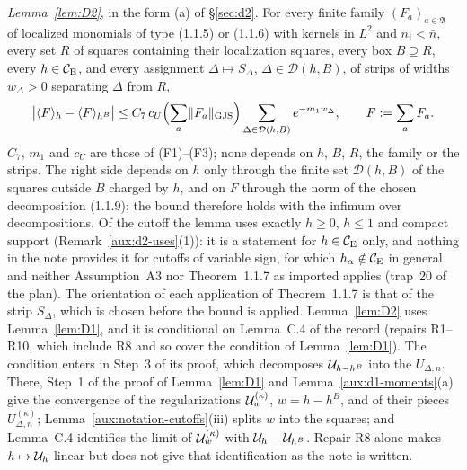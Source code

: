 \emph{Lemma~\ref{lem:D2}}, in the form (a) of \S\ref{sec:d2}. For every finite family
$(F_a)_{a\in\mathfrak A}$ of localized monomials of type (1.1.5) or (1.1.6) with kernels in
$L^2$ and $n_i<\bar n$, every set $R$ of squares containing their localization squares, every
box $B\supseteq R$, every $h\in\mathcal{C}_{\mathrm E}$, and every assignment $\Delta\mapsto S_\Delta$,
$\Delta\in\mathcal D(h,B)$, of strips of widths $w_\Delta>0$ separating $\Delta$ from $R$,
\[
 \bigl|\langle F\rangle_{h}-\langle F\rangle_{h^B}\bigr|\le C_7\,c_U\Bigl(\sum_a\lVert F_a\rVert_{\mathrm{GJS}}\Bigr)
 \sum_{\Delta\in\mathcal D(h,B)}e^{-m_1w_\Delta},\qquad F:=\sum_aF_a .
\]
$C_7$, $m_1$ and $c_U$ are those of (F1)--(F3); none depends on $h$, $B$, $R$, the family or the
strips. The right side depends on $h$ only through the finite set $\mathcal D(h,B)$ of the
squares outside $B$ charged by $h$, and on $F$ through the norm of the chosen decomposition
(1.1.9); the bound therefore holds with the infimum over decompositions. Of the cutoff the
lemma uses exactly $h\ge0$, $h\le1$ and compact support (Remark~\ref{aux:d2-uses}(1)): it is a
statement for $h\in\mathcal{C}_{\mathrm E}$ only, and nothing in the note provides it for cutoffs of variable sign,
for which $h_\alpha\notin\mathcal{C}_{\mathrm E}$ in general and neither Assumption~A3 nor Theorem~1.1.7 as
imported applies (trap~20 of the plan). The orientation of each application of
Theorem~1.1.7 is that of the strip $S_\Delta$, which is chosen before the bound is applied.
Lemma~\ref{lem:D2} uses Lemma~\ref{lem:D1}, and it is conditional on Lemma~C.4 of the record
(repairs R1--R10, which include R8 and so cover the condition of Lemma~\ref{lem:D1}).  The
condition enters in Step~3 of its proof, which decomposes $\mathcal U_{h-h^B}$ into the
$U_{\Delta,n}$.  There, Step~1 of the proof of Lemma~\ref{lem:D1} and
Lemma~\ref{aux:d1-moments}(a) give the convergence of the regularizations $\mathcal U^{(\kappa)}_w$,
$w=h-h^B$, and of their pieces $U^{(\kappa)}_{\Delta,n}$; Lemma~\ref{aux:notation-cutoffs}(iii)
splits $w$ into the squares; and Lemma~C.4 identifies the limit of $\mathcal U^{(\kappa)}_w$ with
$\mathcal U_h-\mathcal U_{h^B}$.  Repair R8 alone makes $h\mapsto\mathcal U_h$ linear but does not give that
identification as the note is written.

